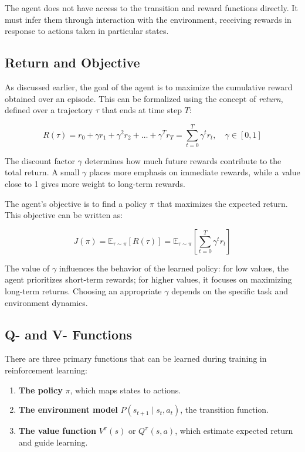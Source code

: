 \documentclass[a4paper,oneside]{book}
\theoremstyle{definition}
\begin{document}
The agent does not have access to the transition and reward functions directly. It must infer them through interaction with the environment, receiving rewards in response to actions taken in particular states.

\subsection*{Return and Objective}

As discussed earlier, the goal of the agent is to maximize the cumulative reward obtained over an episode. This can be formalized using the concept of \textit{return}, defined over a trajectory \( \tau \) that ends at time step \( T \):

\begin{equation}
R(\tau) = r_0 + \gamma r_1 + \gamma^2 r_2 + \dots + \gamma^T r_T = \sum_{t=0}^T \gamma^t r_t, \quad \gamma \in [0, 1]
\label{eq:return}
\end{equation}

The discount factor \( \gamma \) determines how much future rewards contribute to the total return. A small \( \gamma \) places more emphasis on immediate rewards, while a value close to 1 gives more weight to long-term rewards.

The agent's objective is to find a policy \( \pi \) that maximizes the expected return. This objective can be written as:

\begin{equation}
J(\pi) = \mathbb{E}_{\tau \sim \pi} \left[ R(\tau) \right] = \mathbb{E}_{\tau \sim \pi} \left[ \sum_{t=0}^T \gamma^t r_t \right]
\label{eq:objective}
\end{equation}

The value of \( \gamma \) influences the behavior of the learned policy: for low values, the agent prioritizes short-term rewards; for higher values, it focuses on maximizing long-term returns. Choosing an appropriate \( \gamma \) depends on the specific task and environment dynamics.

\subsection{Q- and V- Functions}
There are three primary functions that can be learned during training in reinforcement learning:

\begin{enumerate}
    \item \textbf{The policy} \( \pi \), which maps states to actions.
    \item \textbf{The environment model} \( P(s_{t+1} \mid s_t, a_t) \), the transition function.
    \item \textbf{The value function} \( V^\pi(s) \) or \( Q^\pi(s, a) \), which estimate expected return and guide learning.
\end{enumerate}
\end{document}
